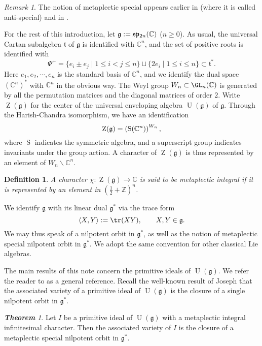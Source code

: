 \documentclass[12pt,a4paper]{amsart}
\newcommand{\BC}{{\mathbb {C}}}
\newcommand{\BZ}{{\mathbb {Z}}}
\newcommand{\oS}{\operatorname{S}}
\newcommand{\oZ}{\operatorname{Z}}
\newcommand{\oU}{\operatorname{U}}
\newcommand{\g}{\mathfrak g}
\newcommand{\h}{\mathfrak h}
\newcommand{\p}{\mathfrak p}
\renewcommand{\t}{\mathfrak t}
\newcommand{\s}{\mathfrak s}
\newcommand{\la}{\langle}
\newcommand{\ra}{\rangle}
\newcommand{\be}{\begin {equation}}
\newcommand{\ee}{\end {equation}}
\numberwithin{equation}{section}
\newtheorem{thm}{Theorem}[section]
\newtheorem{defn}[thm]{Definition}
\theoremstyle{remark}
\newtheorem*{remark}{Remark}
\newtheorem{introtheorem}{\bf{Theorem}}
\begin{document}
\begin{remark} The notion of metaplectic special appears earlier in \cite{Mo96} (where it is called anti-special) and in \cite{JLS}.
\end{remark}

For the rest of this introduction, let $\g:=\s\p_{2n}(\C)$ ($n\geq 0$). %
As usual, the universal Cartan subalgebra $\t$ of $\g$ is identified with $\BC^n$, and the set of positive roots is identified with
\[
  \Psi^+=\{e_i\pm e_j\mid 1\leq i<j\leq n\}\sqcup \{2e_i\mid 1\leq i\leq n\}\subset \t^*.
\]
Here $e_1, e_2,\cdots, e_n$ is the standard basis of $\BC^n$, and we identify the dual space $(\BC^n)^*$ with $\BC^n$ in the obvious way. The Weyl group $W_n\subset \GL_n(\BC)$ is generated by all the permutation matrices and the diagonal matrices of order $2$. Write $\oZ(\g)$ for the center of the universal enveloping algebra $\oU(\g)$ of $\g$.  Through the Harish-Chandra isomorphism, we have an identification
\be\label{zg}
 \oZ(\g)=\left(\oS(\C^n)\right)^{W_n},
\ee
where $\oS$ indicates the symmetric algebra, and a superscript group indicates invariants under the group action.
A character of $\oZ(\g)$ is thus represented by an element of $W_n\backslash \BC^n$.

\begin{defn}
A character $\chi: \oZ(\g)\rightarrow \BC$ is said to be metaplectic integral if it is represented by an element in $(\frac{1}{2}+\BZ)^n$.
\end{defn}


We identify $\g$ with its linear dual $\g^*$ via the trace form
\[
  \la X, Y\ra:=\tr(XY),\qquad X, Y\in \g.
\]
We may thus speak of a nilpotent orbit in $\g^*$, as well as the notion of metaplectic special nilpotent orbit in $\g^*$. We adopt the same convention for other classical Lie algebras.

The main results of this note concern the primitive ideals of $\oU(\g)$. We refer the reader to \cite{Dix} as a general reference.
Recall the well-known result of Joseph \cite{Jos} that the associated variety of a primitive ideal of $\oU(\g)$ is the closure of a single nilpotent orbit in $\g^*$.

\begin{introtheorem}\label{thm13}
Let $I$ be a primitive ideal of $\oU(\g)$ with a metaplectic integral infinitesimal character.  Then the associated variety of $I$ is the closure of a metaplectic special nilpotent orbit in $\g^*$.
\end{introtheorem}
\end{document}
